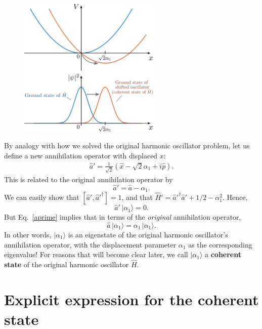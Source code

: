 \documentclass[pra,12pt]{revtex4}
\begin{document}
\begin{figure}[h]
  \centering\includegraphics[width=0.6\textwidth]{coherent_state}
\end{figure}

By analogy with how we solved the original harmonic oscillator
problem, let us define a new annihilation operator with displaced $x$:
\begin{align}
  \hat{a}' = \frac{1}{\sqrt{2}}\left(\hat{x} - \sqrt{2}\alpha_1 + i \hat{p}\right).
\end{align}
This is related to the original annihilation operator by
\begin{equation}
  \hat{a}' = \hat{a} - \alpha_1.
  \label{aprime}
\end{equation}
We can easily show that $[\hat{a}',\hat{a}'^\dagger] = 1$, and that
$\hat{H}' = \hat{a}'^\dagger \hat{a}' + 1/2 - \alpha_1^2$.  Hence,
\begin{equation}
  \hat{a}' \, |\alpha_1 \rangle = 0.
\end{equation}
But Eq.~\eqref{aprime} implies that in terms of the \textit{original}
annihilation operator,
\begin{equation}
  \hat{a}\, |\alpha_1\rangle = \alpha_1 \,|\alpha_1\rangle.
  \label{aeigenv}
\end{equation}
In other words, $|\alpha_1\rangle$ is an eigenstate of the original
harmonic oscillator's annihilation operator, with the displacement
parameter $\alpha_1$ as the corresponding eigenvalue!  For reasons
that will become clear later, we call $|\alpha_1\rangle$ a
\textbf{coherent state} of the original harmonic oscillator $\hat{H}$.

\section{Explicit expression for the coherent state}
\end{document}
